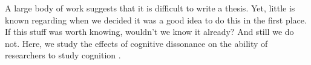 
A large body of work suggests that it is difficult to write a thesis.
Yet, little is known regarding when we decided it was a good idea to do this in the first place.
If this stuff was worth knowing, wouldn't we know it already?
And still we do not.
Here, we study the effects of cognitive dissonance on the ability of researchers to study cognition \citep{Brehm:1962}.
